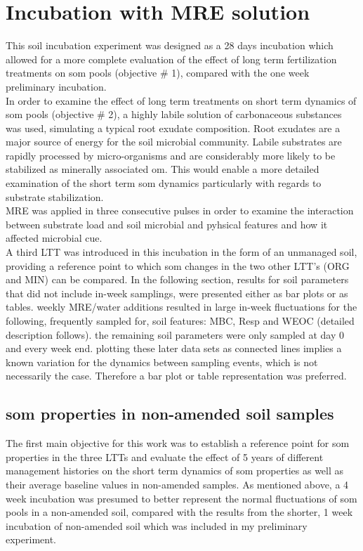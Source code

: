 \section{Incubation with MRE solution}
	This soil incubation experiment was designed as a 28 days incubation which allowed for a more complete evaluation of the effect of long term fertilization treatments on \gls{som} pools (objective \# 1), compared with the one week  preliminary incubation.\\
	In order to examine the effect of long term treatments on short term dynamics of \gls{som} pools (objective \# 2), a highly labile solution of carbonaceous substances was used, simulating a typical root exudate composition. Root exudates are a major source of energy for the soil microbial community. Labile substrates are rapidly processed by micro-organisms and are considerably more likely to be stabilized as minerally associated \gls{om}. This would enable a more detailed examination of the short term \gls{som} dynamics particularly with regards to substrate stabilization. \\
	MRE was applied in three consecutive pulses in order to examine the interaction between substrate load and soil microbial and pyhsical features and how it affected microbial \gls{cue}. \\
	A third LTT was introduced in this incubation in the form of an unmanaged soil, providing a reference point to which \gls{som} changes in the two other LTT's (ORG and MIN) can be compared.
	In the following section, results for soil parameters that did not include in-week samplings, were presented either as bar plots  or as tables.	weekly MRE/water additions resulted in large in-week fluctuations for the following, frequently sampled for, soil features: MBC, Resp and WEOC (detailed description follows). the remaining soil parameters were only sampled at day 0 and every week end. plotting these later data sets as connected lines implies a known variation for the dynamics between sampling events, which is not necessarily the case. Therefore a bar plot or table representation was preferred.

	\subsection{\gls{som} properties in non-amended soil samples}

		The first main objective for this work was to establish a reference point  for \gls{som} properties in the three LTTs and evaluate the effect of 5 years of different management histories on the short term dynamics of \gls{som} properties as well as their average baseline values in non-amended samples. As mentioned above, a 4 week incubation was presumed  to better represent the normal fluctuations of \gls{som} pools in a non-amended soil, compared with the results from the shorter, 1 week incubation of non-amended soil which was  included in my preliminary experiment.


